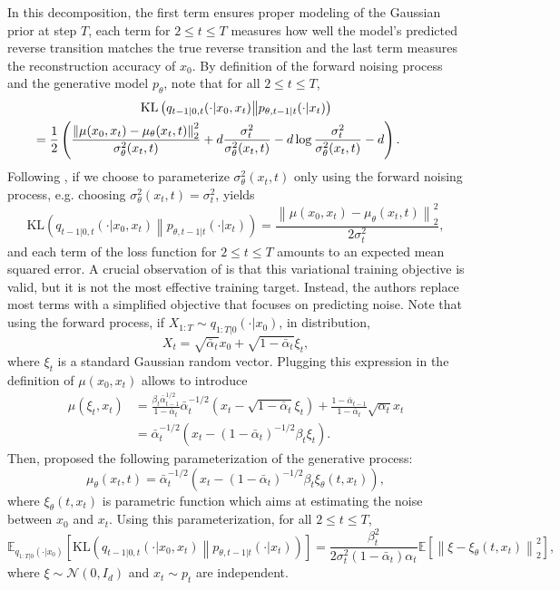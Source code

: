 \documentclass[english,graybox,envcountchap,envcountsame,sectrefs,shortlabels]{svmono}
\theoremstyle{style}
\newcommand{\eqsp}{}
\begin{document}
In this decomposition, the first term ensures proper modeling of the Gaussian prior at step $T$, each term for $2\leqslant t \leqslant T$ measures how well the model's predicted reverse transition matches the true reverse transition and the last term measures the  reconstruction accuracy of $x_0$. By definition of the forward noising process and the generative model $p_\theta$, note that for all $2\leqslant t \leqslant T$,
\begin{multline*}
\mathrm{KL}\left(q_{t-1|0,t}(\cdot|x_0,x_t)\middle\|p_{\theta,t-1|t}(\cdot|x_t)\right) \\
\hspace{-1cm}= \frac{1}{2}\left( \frac{\left\|\mu(x_0,x_t) - \mu_\theta(x_{t}, t)\right\|_2^2}{\sigma^{2}_{\theta}(x_t,t)} + d\frac{\sigma^{2}_{t}}{\sigma^{2}_{\theta}(x_t,t)} - d\log\frac{\sigma^{2}_{t}}{\sigma^{2}_{\theta}(x_t,t)} -d\right) \eqsp.
\end{multline*}
Following \cite{ho2020denoising}, if we choose to parameterize $\sigma^{2}_{\theta}(x_t,t)$ only using the forward noising process, e.g. choosing $\sigma^{2}_{\theta}(x_t,t) = \sigma^{2}_{t}$, yields
$$
\mathrm{KL}\left(q_{t-1|0,t}(\cdot|x_0,x_t)\middle\|p_{\theta,t-1|t}(\cdot|x_t)\right) =  \frac{\left\|\mu(x_0,x_t) - \mu_\theta(x_{t}, t)\right\|_2^2}{2\sigma^{2}_{t}}\eqsp,
$$
and each term of the loss function for $2\leqslant t\leqslant T$ amounts to an expected mean squared error. A crucial observation of \cite{ho2020denoising} is that this variational training objective is valid, but it is not the most effective training target. Instead, the authors replace most terms with a simplified objective that focuses on predicting noise. Note that using the forward process, if $X_{1:T}\sim q_{1:T|0}(\cdot|x_0)$,  in distribution,
$$
X_t = \sqrt{\bar{\alpha}_t}x_0 + \sqrt{1-\bar{\alpha}_t}\xi_t\eqsp,
$$
where $\xi_t$ is a standard Gaussian random vector. Plugging this expression in the definition of $\mu(x_0,x_t)$ allows to introduce
\begin{align*}
\mu(\xi_t,x_t) &= \frac{\beta_t\bar{\alpha}_{t-1}^{1/2}}{1-\bar{\alpha}_t}\bar{\alpha}^{-1/2}_t\left(x_t-\sqrt{1-\bar{\alpha}_t}\xi_t\right) + \frac{1 - \bar{\alpha}_{t-1}}{1 - \bar{\alpha}_t}\sqrt{\alpha_t}x_t\\
&= \bar{\alpha}^{-1/2}_t\left(x_t - \left(1 - \bar{\alpha}_t\right)^{-1/2}\beta_t \xi_t\right)\eqsp.
\end{align*}
Then, \cite{ho2020denoising} proposed the following parameterization of the generative process: 
$$
\mu_\theta(x_{t}, t) = \bar{\alpha}^{-1/2}_t\left(x_t - \left(1 - \bar{\alpha}_t\right)^{-1/2}\beta_t \xi_\theta(t,x_t)\right)\eqsp,
$$
where $\xi_\theta(t,x_t)$ is parametric function which aims at estimating the noise between $x_0$ and $x_t$. Using this parameterization, for all $2\leqslant t \leqslant T$,
$$
\mathbb{E}_{q_{1:T|0}(\cdot|x_0)}\left[\mathrm{KL}\left(q_{t-1|0,t}(\cdot|x_0,x_t)\middle\|p_{\theta,t-1|t}(\cdot|x_t)\right)\right] =  \frac{\beta_t^2}{2\sigma^{2}_{t}\left(1-\bar{\alpha}_t\right)\alpha_t}\mathbb{E}\left[\left\|\xi -  \xi_\theta(t,x_t)\right\|_2^2\right]\eqsp,
$$
where $\xi\sim \mathcal{N}(0,I_d)$ and $x_t\sim p_t$ are independent.
\end{document}
